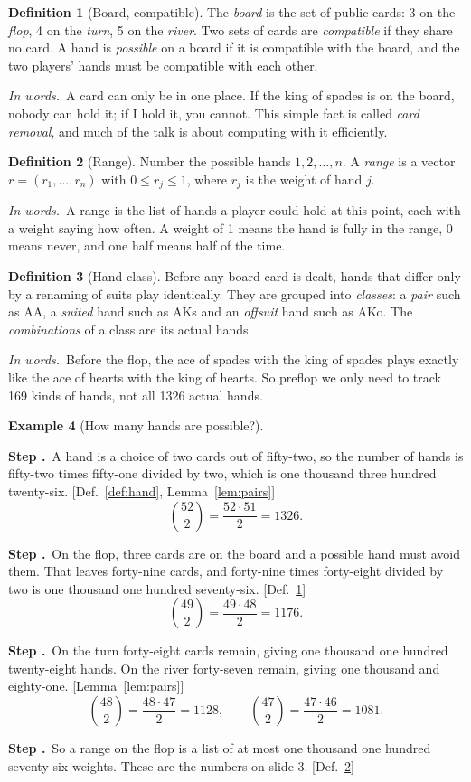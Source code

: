\documentclass[11pt]{article}
\theoremstyle{definition}
\newtheorem{definition}{Definition}[section]
\newtheorem{example}[definition]{Example}
\newcommand{\inwords}{\par\smallskip\noindent\textit{In words.}\ }
\newcounter{stp}
\newcommand{\steps}{\setcounter{stp}{0}}
\newcommand{\st}{\stepcounter{stp}\par\medskip\noindent\textbf{Step \arabic{stp}.}\ }
\newcommand{\by}[1]{\hfill{\small\color{blue!50!black}[#1]}}
\newcommand{\Def}[1]{Def.~\ref{#1}}\newcommand{\Lem}[1]{Lemma~\ref{#1}}\newcommand{\Thm}[1]{Thm.~\ref{#1}}
\begin{document}
\begin{definition}[Board, compatible]\label{def:board}
The \emph{board} is the set of public cards: 3 on the \emph{flop}, 4 on the \emph{turn}, 5 on the \emph{river}. Two
sets of cards are \emph{compatible} if they share no card. A hand is \emph{possible} on a board if it is compatible
with the board, and the two players' hands must be compatible with each other.
\inwords A card can only be in one place. If the king of spades is on the board, nobody can hold it; if I hold it, you
cannot. This simple fact is called \emph{card removal}, and much of the talk is about computing with it efficiently.
\end{definition}

\begin{definition}[Range]\label{def:range}
Number the possible hands $1,2,\dots,n$. A \emph{range} is a vector $r=(r_1,\dots,r_n)$ with $0\le r_j\le1$, where $r_j$
is the weight of hand $j$.
\inwords A range is the list of hands a player could hold at this point, each with a weight saying how often. A weight
of 1 means the hand is fully in the range, 0 means never, and one half means half of the time.
\end{definition}

\begin{definition}[Hand class]\label{def:class}
Before any board card is dealt, hands that differ only by a renaming of suits play identically. They are grouped into
\emph{classes}: a \emph{pair} such as AA, a \emph{suited} hand such as AKs and an \emph{offsuit} hand such as AKo. The
\emph{combinations} of a class are its actual hands.
\inwords Before the flop, the ace of spades with the king of spades plays exactly like the ace of hearts with the king of
hearts. So preflop we only need to track 169 kinds of hands, not all 1326 actual hands.
\end{definition}

\begin{example}[How many hands are possible?]\label{ex:count}
\steps
\st A hand is a choice of two cards out of fifty-two, so the number of hands is fifty-two times fifty-one divided by two,
which is one thousand three hundred twenty-six. \by{\Def{def:hand}, \Lem{lem:pairs}}
\[ \binom{52}{2}=\frac{52\cdot51}{2}=1326. \]
\st On the flop, three cards are on the board and a possible hand must avoid them. That leaves forty-nine cards, and
forty-nine times forty-eight divided by two is one thousand one hundred seventy-six. \by{\Def{def:board}}
\[ \binom{49}{2}=\frac{49\cdot48}{2}=1176. \]
\st On the turn forty-eight cards remain, giving one thousand one hundred twenty-eight hands. On the river forty-seven
remain, giving one thousand and eighty-one. \by{\Lem{lem:pairs}}
\[ \binom{48}{2}=\frac{48\cdot47}{2}=1128,\qquad \binom{47}{2}=\frac{47\cdot46}{2}=1081. \]
\st So a range on the flop is a list of at most one thousand one hundred seventy-six weights. These are the numbers on
slide 3. \by{\Def{def:range}}
\end{example}
\end{document}
